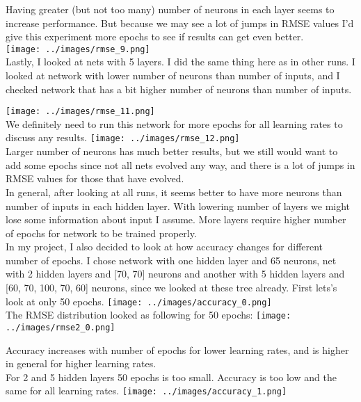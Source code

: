 \documentclass[12pt, letterpaper]{article}
\begin{document}
\begin{enumerate}[label=\Roman*.]
	   Having greater (but not too many) number of neurons in each layer seems to increase performance. But because we may see a lot of jumps in RMSE values I'd give this experiment more epochs to see if results can get even better. \\
	   {\center \texttt{[image: ../images/rmse\_9.png]} \\}
	   Lastly, I looked at nets with 5 layers. I did the same thing here as in other runs. I looked at network with lower number of neurons than number of inputs, and I checked network that has a bit higher number of neurons than number of inputs.
	      
	   {\center \texttt{[image: ../images/rmse\_11.png]} \\}
	   We definitely need to run this network for more epochs for all learning rates to discuss any results.
	   {\center \texttt{[image: ../images/rmse\_12.png]} \\}
	   Larger number of neurons has much better results, but we still would want to add some epochs since not all nets evolved any way, and there is a lot of jumps in RMSE values for those that have evolved.\\
	      
	   In general, after looking at all runs, it seems better to have more neurons than number of inputs in each hidden layer. With lowering number of layers we might lose some information about input I assume. More layers require higher number of epochs for network to be trained properly.\\
	      
	   In my project, I also decided to look at how accuracy changes for different number of epochs. I chose network with one hidden layer and 65 neurons, net with 2 hidden layers and [70, 70] neurons and another with 5 hidden layers and  [60, 70, 100, 70, 60] neurons, since we looked at these tree already. First lets's look at only 50 epochs.
	   {\center \texttt{[image: ../images/accuracy\_0.png]} \\}
	   The RMSE distribution looked as following for 50 epochs: 
	   {\center \texttt{[image: ../images/rmse2\_0.png]} \\}
	          
	   Accuracy  increases with number of epochs for lower learning rates, and is higher in general for higher learning rates. \\
	          
	   For 2 and 5 hidden layers 50 epochs is too small. Accuracy is too low and the same for all learning rates.
	   {\center \texttt{[image: ../images/accuracy\_1.png]} \\}
	           

\end{enumerate}
\end{document}
